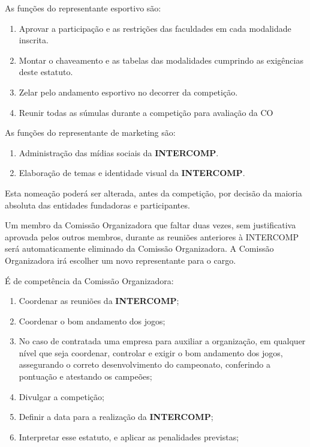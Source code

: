 \begin{article}
	\begin{xparagraph}
		As funções do representante esportivo são:
		\begin{enumerate}[noitemsep]
			\item Aprovar a participação e as restrições das faculdades em cada modalidade inscrita.
			\item Montar o chaveamento e as tabelas das modalidades cumprindo as exigências deste estatuto.
			\item Zelar pelo andamento esportivo no decorrer da competição.
			\item Reunir todas as súmulas durante a competição para avaliação da CO
		\end{enumerate}
	\end{xparagraph}

	\begin{xparagraph}
		As funções do representante de marketing são:
		\begin{enumerate}[noitemsep]
			\item Administração das mídias sociais da \textbf{INTERCOMP}.
			\item Elaboração de temas e identidade visual da \textbf{INTERCOMP}.
		\end{enumerate}
	\end{xparagraph}

	\begin{xparagraph}
		Esta nomeação poderá ser alterada, antes da competição, por decisão da maioria absoluta das entidades fundadoras e participantes.
	\end{xparagraph}

	\begin{xparagraph}
		Um membro da Comissão Organizadora que faltar duas vezes, sem justificativa aprovada pelos outros membros, durante as reuniões anteriores à INTERCOMP será automaticamente eliminado da Comissão Organizadora. A Comissão Organizadora irá escolher um novo representante para o cargo.
	\end{xparagraph}

	\begin{xparagraph}
		É de competência da Comissão Organizadora:
		\begin{enumerate}[noitemsep]
			\item Coordenar as reuniões da \textbf{INTERCOMP};
			\item Coordenar o bom andamento dos jogos;
			\item No caso de contratada uma empresa para auxiliar a organização, em qualquer nível que seja coordenar, controlar e exigir o bom andamento dos jogos, assegurando o correto desenvolvimento do campeonato, conferindo a pontuação e atestando os campeões;
			\item Divulgar a competição;
			\item Definir a data para a realização da \textbf{INTERCOMP};
			\item Interpretar esse estatuto, e aplicar as penalidades previstas;
		\end{enumerate}
	\end{xparagraph}
\end{article}

